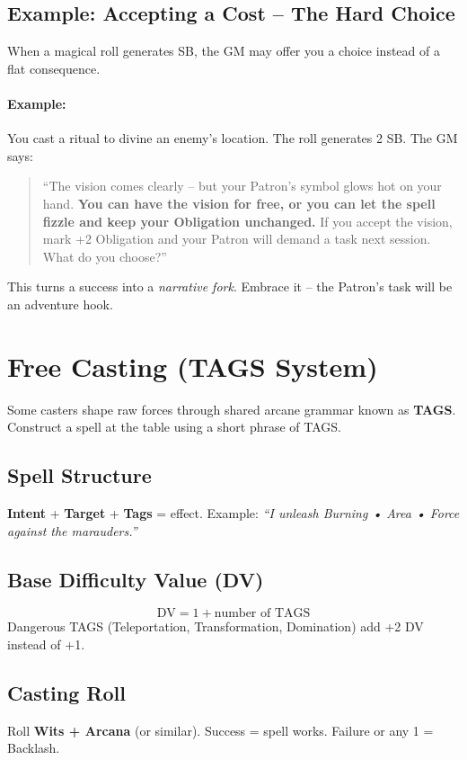 \subsection{Example: Accepting a Cost -- The Hard Choice}
\label{sec:magic-choice-example}
When a magical roll generates SB, the GM may offer you a choice instead of a flat consequence.

\paragraph{Example:}
You cast a ritual to divine an enemy's location. The roll generates 2 SB. The GM says:
\begin{quote}
``The vision comes clearly -- but your Patron's symbol glows hot on your hand. \textbf{You can have the vision for free, or you can let the spell fizzle and keep your Obligation unchanged.} If you accept the vision, mark +2 Obligation and your Patron will demand a task next session. What do you choose?''
\end{quote}
This turns a success into a \emph{narrative fork}. Embrace it -- the Patron's task will be an adventure hook.

\section{Free Casting (TAGS System)}
\label{sec:free_casting_tags}

Some casters shape raw forces through shared arcane grammar known as \textbf{TAGS}. Construct a spell at the table using a short phrase of TAGS.

\subsection{Spell Structure}
\textbf{Intent} + \textbf{Target} + \textbf{Tags} = effect. Example: \textit{``I unleash Burning • Area • Force against the marauders.''}

\subsection{Base Difficulty Value (DV)}
\[
\text{DV} = 1 + \text{number of TAGS}
\]
Dangerous TAGS (Teleportation, Transformation, Domination) add +2 DV instead of +1.

\subsection{Casting Roll}
Roll \textbf{Wits + Arcana} (or similar). Success = spell works. Failure or any 1 = Backlash.

